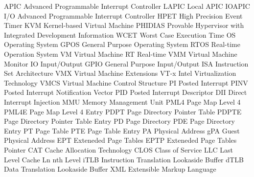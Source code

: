 
\makenoidxglossaries %
\glsdisablehyper

 {APIC} {Advanced Programmable Interrupt Controller}
 {LAPIC} {Local APIC}
 {IOAPIC} {I/O Advanced Programmable Interrupt Controller}
 {HPET} {High Precision Event Timer}
 {KVM} {Kernel-based Virtual Machine}
 {PHIDIAS} {Provable Hypervisor with Integrated Development Information}
 {WCET} {Worst Case Execution Time}
 {OS} {Operating System}
 {GPOS} {General Purpose Operating System}
 {RTOS} {Real-time Operation System}
 {VM} {Virtual Machine}
 {RT} {Real-time}
 {VMM} {Virtual Machine Monitor}
 {IO} {Input/Output}
 {GPIO} {General Purpose Input/Output}
 {ISA} {Instruction Set Architecture}
 {VMX} {Virtual Machine Extensions}
 {VT-x} {Intel Virtualization Technology}
 {VMCS} {Virtual Machine Control Structure}
 {PI} {Posted Interrupt}
 {PINV} {Posted Interrupt Notification Vector}
 {PID} {Posted Interrupt Descriptor}
 {DII} {Direct Interrupt Injection}
 {MMU} {Memory Management Unit}
 {PML4} {Page Map Level 4}
 {PML4E} {Page Map Level 4 Entry}
 {PDPT} {Page Directory Pointer Table}
 {PDPTE} {Page Directory Pointer Table Entry}
 {PD} {Page Directory}
 {PDE} {Page Directory Entry}
 {PT} {Page Table}
 {PTE} {Page Table Entry}
 {PA} {Physical Address}
 {gPA} {Guest Physical Address}
 {EPT} {Exteneded Page Tables}
 {EPTP} {Exteneded Page Tables Pointer}
 {CAT} {Cache Allocation Technology}
 {CLOS} {Class of Service}
 {LLC} {Last Level Cache}
 {Ln} {nth Level}
 {iTLB} {Instruction Translation Lookaside Buffer}
 {dTLB} {Data Translation Lookaside Buffer}
 {XML} {Extensible Markup Language}
